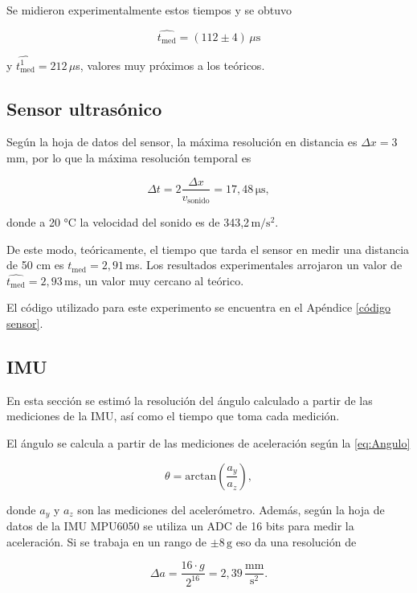 \documentclass[a4paper,12pt]{article}
\begin{document}
Se midieron experimentalmente estos tiempos y se obtuvo 

\[
\widehat{t_\text{med}} = (112 \pm 4)\,\mu\text{s}
\]

y $\widehat{t_\text{med}^1} = 212 \, \mu$s, valores muy próximos a los teóricos.

\subsection{Sensor ultrasónico}

Según la hoja de datos del sensor, la máxima resolución en distancia es $\Delta x = 3\,$mm, por lo que la máxima resolución temporal es

\[
\Delta t = 2 \frac{\Delta x}{v_\text{sonido}} = 17,48 \, \mathrm{\mu s} ,
\]

donde a 20 °C la velocidad del sonido es de 343,2$\,\mathrm{m/s^2}$.

De este modo, teóricamente, el tiempo que tarda el sensor en medir una distancia de 50 cm es $t_\text{med} = 2,91 \,$ms. Los resultados experimentales arrojaron un valor de $\widehat{t_\text{med}} = 2,93 \,$ms, un valor muy cercano al teórico.

El código utilizado para este experimento se encuentra en el Apéndice \ref{código sensor}.

\subsection{IMU}

En esta sección se estimó la resolución del ángulo calculado a partir de las mediciones de la IMU, así como el tiempo que toma cada medición. 

El ángulo se calcula a partir de las mediciones de aceleración según la \autoref{eq:Angulo}

\begin{equation}
    \label{eq:Angulo}
    \theta = \text{arctan}\left(\frac{a_y}{a_z}\right),
\end{equation}

donde $a_y$ y $a_z$ son las mediciones del acelerómetro. Además, según la hoja de datos de la IMU MPU6050 se utiliza un ADC de 16 bits para medir la aceleración. Si se trabaja en un rango de $\pm 8 \,\text{g}$ eso da una resolución de

\begin{equation}
    \Delta a = \frac{16 \cdot g}{2^{16}} = 2,39 \, \frac{\text{mm}}{\text{s}^2}.
\end{equation}
\end{document}
